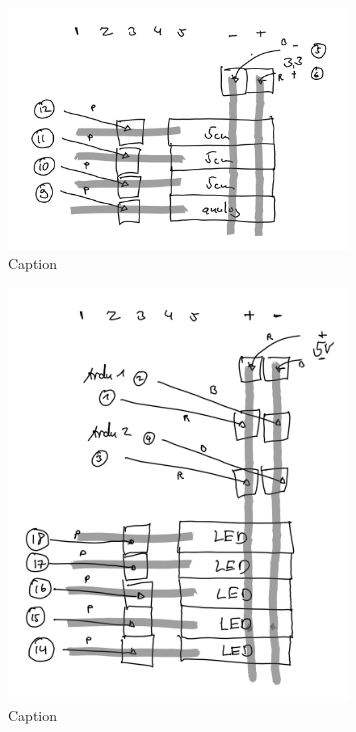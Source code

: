     \begin{figure}[h]
        \begin{center}
            \includegraphics[width=9cm]{media/03_technical_implementation/header_1.png}
        \end{center}
        \caption{Caption}
        \label{fig:header_1}
    \end{figure}

    \begin{figure}[h]
        \begin{center}
            \includegraphics[width=9cm]{media/03_technical_implementation/header_2.png}
        \end{center}
        \caption{Caption}
        \label{fig:header_2}
    \end{figure}




